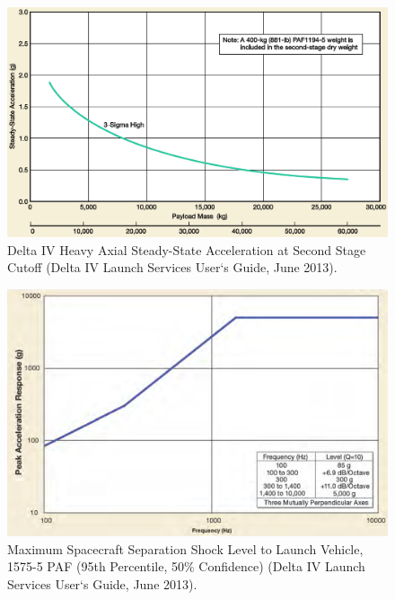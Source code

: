 \begin{figure}[htb]
\centering
\includegraphics[scale=0.3]{figures/Orbiter/g_2ndstage.png}
\caption{Delta IV Heavy Axial Steady-State Acceleration at Second Stage Cutoff (Delta IV Launch Services User‘s Guide, June 2013).\cite{Atlasm}}
\end{figure}

\begin{figure}[htb]
\centering
\includegraphics[scale=0.3]{figures/Orbiter/fairing_sep_resp.png}
\caption{Maximum Spacecraft Separation Shock Level to Launch Vehicle, 1575-5 PAF (95th Percentile, 50\% Confidence) (Delta IV Launch Services User‘s Guide, June 2013).\cite{Atlasm}}
\end{figure}

